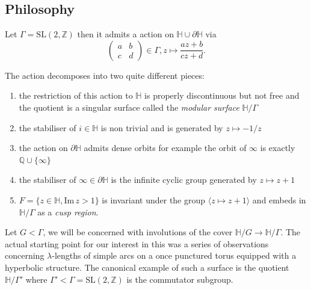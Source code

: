 \documentclass[12pt,a4paper]{amsart}
\def\HH{\mathbb{H}}
\def\dHH{\partial \mathbb{H}}
\def\ZZ{\mathbb{Z}}
\def\sl2{\mathrm{SL}(2, \ZZ)}
\begin{document}
\subsection{Philosophy}

Let $\Gamma = \sl2$ then it admits a action on $\mathbb{H}\cup \dHH$ via
$$
\begin{pmatrix} a&b\\c&d \end{pmatrix} \in \Gamma,
z \mapsto \frac{az + b}{cz + d}.
$$

The action decomposes into two quite different pieces:
\begin{enumerate}
	\item the restriction of this action to $\mathbb{H}$
		is properly discontinuous but not free and the quotient is
		a singular surface called the \textit{modular
		surface} $\mathbb{H}/\Gamma$
	\item	the stabiliser of $i\in \mathbb{H}$ is non
		trivial and is generated by $z\mapsto -1 / z$
	\item the action on $\dHH$ admits dense orbits for
		example the orbit of $\infty$ is exactly
		$\mathbb{Q}\cup \{\infty\}$
	\item the stabiliser of $\infty \in \dHH$ is the
		infinite cyclic group generated by $z\mapsto
		z+1$

	\item $F = \{z\in \mathbb{H}, \mathrm{Im}\,z > 1\}$ is
		invariant under the group $\langle z \mapsto
		z+1 \rangle$  and embeds in
		$\mathbb{H}/\Gamma$ as a \textit{cusp region}.

\end{enumerate}

Let $G<\Gamma$,
we will be concerned with involutions of the cover 
$\mathbb{H}/G\rightarrow \mathbb{H}/\Gamma$.
The actual starting point for our interest in this was a series of observations
concerning $\lambda$-lengths of simple arcs on a once punctured
torus equipped with a hyperbolic structure.
The canonical  example of such a surface is the quotient $\HH/\Gamma'$
where $\Gamma' < \Gamma = \sl2$ is the commutator subgroup. 

\end{document}
